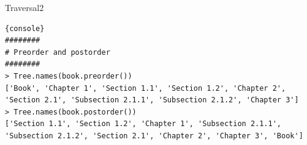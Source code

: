 \begin{task}{Traversal}{2}
\begin{lstlisting}{console}
########
# Preorder and postorder
########
> Tree.names(book.preorder())
['Book', 'Chapter 1', 'Section 1.1', 'Section 1.2', 'Chapter 2',
'Section 2.1', 'Subsection 2.1.1', 'Subsection 2.1.2', 'Chapter 3']
> Tree.names(book.postorder())
['Section 1.1', 'Section 1.2', 'Chapter 1', 'Subsection 2.1.1',
'Subsection 2.1.2', 'Section 2.1', 'Chapter 2', 'Chapter 3', 'Book']
\end{lstlisting}
\end{task}


